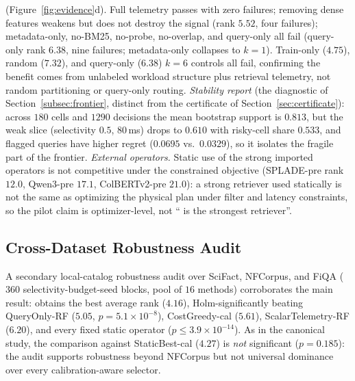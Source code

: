  (Figure~\ref{fig:evidence}d). Full telemetry passes with zero failures; removing dense features weakens but does not destroy the signal (rank $5.52$, four failures); metadata-only, no-BM25, no-probe, no-overlap, and query-only all fail (query-only rank $6.38$, nine failures; metadata-only collapses to $k{=}1$). Train-only ($4.75$), random ($7.32$), and query-only ($6.38$) $k{=}6$ controls all fail, confirming the benefit comes from unlabeled workload structure plus retrieval telemetry, not random partitioning or query-only routing. \emph{Stability report} (the diagnostic of Section~\ref{subsec:frontier}, distinct from the certificate of Section~\ref{sec:certificate}): across $180$ cells and $1290$ decisions the mean bootstrap support is $0.813$, but the weak slice (selectivity $0.5$, $80$\,ms) drops to $0.610$ with risky-cell share $0.533$, and flagged queries have higher regret ($0.0695$ vs.\ $0.0329$), so it isolates the fragile part of the frontier. \emph{External operators.} Static use of the strong imported operators is not competitive under the constrained objective (SPLADE-pre rank $12.0$, Qwen3-pre $17.1$, ColBERTv2-pre $21.0$): a strong retriever used statically is not the same as optimizing the physical plan under filter and latency constraints, so the pilot claim is optimizer-level, not ``\WCR{} is the strongest retriever''.

\subsection{Cross-Dataset Robustness Audit}
\label{sec:results-audit}

A secondary local-catalog robustness audit over SciFact, NFCorpus, and FiQA ($360$ selectivity-budget-seed blocks, pool of $16$ methods) corroborates the main result: \WCR{} obtains the best average rank ($4.16$), Holm-significantly beating QueryOnly-RF ($5.05$, $p{=}5.1{\times}10^{-8}$), CostGreedy-cal ($5.61$), ScalarTelemetry-RF ($6.20$), and every fixed static operator ($p\le3.9{\times}10^{-14}$). As in the canonical study, the comparison against StaticBest-cal ($4.27$) is \emph{not} significant ($p{=}0.185$): the audit supports robustness beyond NFCorpus but not universal dominance over every calibration-aware selector.

